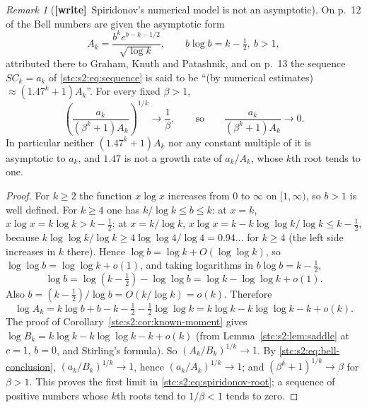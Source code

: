 \documentclass[11pt,letterpaper]{article}
\numberwithin{equation}{section}
\theoremstyle{remark}\newtheorem{remark}[theorem]{Remark}
\newcommand{\wtag}{\textup{\textbf{[write]}}}
\begin{document}
\begin{remark}[\wtag\ Spiridonov's numerical model is not an asymptotic]\label{stc:s2:rem:spiridonov}
On p.~12 of \cite{spiridonov} the Bell numbers are given the asymptotic form
\begin{equation}\label{stc:s2:eq:spiridonov-A}
 A_k=\frac{b^ke^{b-k-1/2}}{\sqrt{\log k}},\qquad b\log b=k-\tfrac12,\ b>1,
\end{equation}
attributed there to Graham, Knuth and Patashnik, and on p.~13 the sequence $SC_k=a_k$ of \eqref{stc:s2:eq:sequence} is said to be ``(by numerical estimates) $\approx(1.47^k+1)A_k$''. For every fixed $\beta>1$,
\begin{equation}\label{stc:s2:eq:spiridonov-root}
 \left(\frac{a_k}{(\beta^k+1)A_k}\right)^{1/k}\longrightarrow\frac1\beta,
 \qquad\text{so}\qquad \frac{a_k}{(\beta^k+1)A_k}\longrightarrow0 .
\end{equation}
In particular neither $(1.47^k+1)A_k$ nor any constant multiple of it is asymptotic to $a_k$, and $1.47$ is not a growth rate of $a_k/A_k$, whose $k$th root tends to one.
\end{remark}
\begin{proof}
For $k\ge2$ the function $x\log x$ increases from $0$ to $\infty$ on $[1,\infty)$, so $b>1$ is well defined. For $k\ge4$ one has $k/\log k\le b\le k$: at $x=k$, $x\log x=k\log k>k-\frac12$; at $x=k/\log k$, $x\log x=k-k\log\log k/\log k\le k-\frac12$, because $k\log\log k/\log k\ge4\log\log4/\log4=0.94\ldots$ for $k\ge4$ (the left side increases in $k$ there). Hence $\log b=\log k+O(\log\log k)$, so $\log\log b=\log\log k+o(1)$, and taking logarithms in $b\log b=k-\frac12$,
\[
 \log b=\log(k-\tfrac12)-\log\log b=\log k-\log\log k+o(1).
\]
Also $b=(k-\frac12)/\log b=O(k/\log k)=o(k)$. Therefore
\[
 \log A_k=k\log b+b-k-\tfrac12-\tfrac12\log\log k=k\log k-k\log\log k-k+o(k).
\]
The proof of Corollary~\ref{stc:s2:cor:known-moment} gives $\log B_k=k\log k-k\log\log k-k+o(k)$ (from Lemma~\ref{stc:s2:lem:saddle} at $c=1$, $b=0$, and Stirling's formula). So $(A_k/B_k)^{1/k}\to1$. By \eqref{stc:s2:eq:bell-conclusion}, $(a_k/B_k)^{1/k}\to1$, hence $(a_k/A_k)^{1/k}\to1$; and $(\beta^k+1)^{1/k}\to\beta$ for $\beta>1$. This proves the first limit in \eqref{stc:s2:eq:spiridonov-root}; a sequence of positive numbers whose $k$th roots tend to $1/\beta<1$ tends to zero.
\end{proof}
\end{document}
